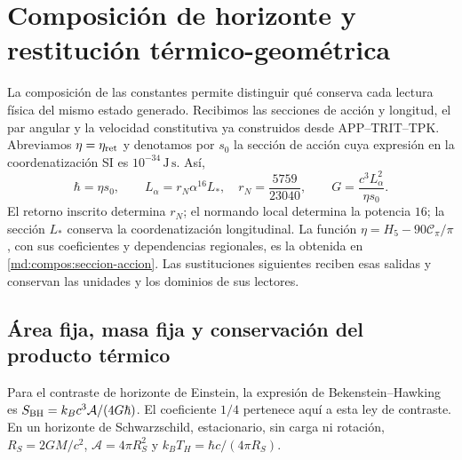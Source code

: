 \section{Composición de horizonte y restitución térmico-geométrica}
\label{ins29:vii:horizonte}

La composición de las constantes permite distinguir qué conserva cada
lectura física del mismo estado generado. Recibimos las secciones de
acción y longitud, el par angular y la velocidad constitutiva ya
construidos desde APP--TRIT--TPK. Abreviamos \(\eta=\eta_{\rm ret}\)
y denotamos por \(s_0\) la sección de acción cuya expresión en la coordenatización
SI es \(10^{-34}\,\mathrm{J\,s}\). Así,
\[
 \hbar=\eta s_0,\qquad
 L_\alpha=r_N\alpha^{16}L_*,\quad r_N=\frac{5759}{23040},\qquad
 G=\frac{c^3L_\alpha^2}{\eta s_0}.
\]
El retorno inscrito determina \(r_N\); el normando local determina la
potencia \(16\); la sección \(L_*\) conserva la coordenatización longitudinal.
La función \(\eta=H_5-90\mathcal C_\pi/\pi\), con sus coeficientes y
dependencias regionales, es la obtenida en
\eqref{md:compos:seccion-accion}. Las sustituciones siguientes reciben esas
salidas y conservan las unidades y los dominios de sus lectores.

\subsection{Área fija, masa fija y conservación del producto térmico}

Para el contraste de horizonte de Einstein, la expresión de
Bekenstein--Hawking es
\(S_{\rm BH}=k_Bc^3\mathcal A/(4G\hbar)\).
El coeficiente \(1/4\) pertenece aquí a esta ley de contraste.
En un horizonte de Schwarzschild, estacionario, sin carga ni rotación,
\(R_S=2GM/c^2\), \(\mathcal A=4\pi R_S^2\) y
\(k_BT_H=\hbar c/(4\pi R_S)\).

